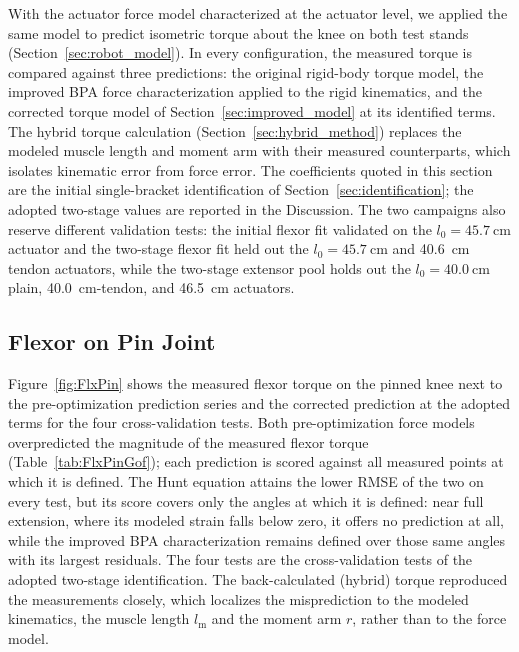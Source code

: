\documentclass[utf8]{FrontiersinHarvard} %
\begin{document}
With the actuator force model characterized at the actuator level, we applied the same model to predict isometric torque about the knee on both test stands (Section~\ref{sec:robot_model}). In every configuration, the measured torque is compared against three predictions: the original rigid-body torque model, the improved BPA force characterization applied to the rigid kinematics, and the corrected torque model of Section~\ref{sec:improved_model} at its identified terms. The hybrid torque calculation (Section~\ref{sec:hybrid_method}) replaces the modeled muscle length and moment arm with their measured counterparts, which isolates kinematic error from force error. The coefficients quoted in this section are the initial single-bracket identification of Section~\ref{sec:identification}; the adopted two-stage values are reported in the Discussion. The two campaigns also reserve different validation tests: the initial flexor fit validated on the $l_{0}=\qty{45.7}{\cm}$ actuator and the two-stage flexor fit held out the $l_{0}=\qty{45.7}{\cm}$ and \qty{40.6}{\cm} tendon actuators, while the two-stage extensor pool holds out the $l_{0}=\qty{40.0}{\cm}$ plain, \qty{40.0}{\cm}-tendon, and \qty{46.5}{\cm} actuators.

\subsection{Flexor on Pin Joint}

Figure~\ref{fig:FlxPin} shows the measured flexor torque on the pinned knee next to the pre-optimization prediction series and the corrected prediction at the adopted terms for the four cross-validation tests. Both pre-optimization force models overpredicted the magnitude of the measured flexor torque (Table~\ref{tab:FlxPinGof}); each prediction is scored against all measured points at which it is defined. The Hunt equation attains the lower RMSE of the two on every test, but its score covers only the angles at which it is defined: near full extension, where its modeled strain falls below zero, it offers no prediction at all, while the improved BPA characterization remains defined over those same angles with its largest residuals. The four tests are the cross-validation tests of the adopted two-stage identification. The back-calculated (hybrid) torque reproduced the measurements closely, which localizes the misprediction to the modeled kinematics, the muscle length $l_\text{m}$ and the moment arm $r$, rather than to the force model.
\end{document}
